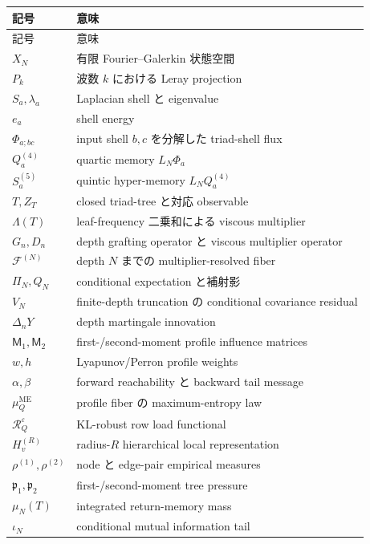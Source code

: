 \documentclass[11pt,a4paper,openany]{book}
\numberwithin{equation}{chapter}
\newcommand{\cF}{\mathcal F}
\newcommand{\cR}{\mathcal R}
\begin{document}
\begin{longtable}{p{}p{}}
\toprule
記号 & 意味 \\
\midrule
\endfirsthead
\toprule
記号 & 意味 \\
\midrule
\endhead
$X_N$ & 有限 Fourier--Galerkin 状態空間 \\
$P_k$ & 波数 $k$ における Leray projection \\
$S_a,\lambda_a$ & Laplacian shell と eigenvalue \\
$e_a$ & shell energy \\
$\Phi_{a;bc}$ & input shell $b,c$ を分解した triad-shell flux \\
$Q_a^{(4)}$ & quartic memory $L_N\Phi_a$ \\
$S_a^{(5)}$ & quintic hyper-memory $L_NQ_a^{(4)}$ \\
$T,Z_T$ & closed triad-tree と対応 observable \\
$\Lambda(T)$ & leaf-frequency 二乗和による viscous multiplier \\
$G_n,D_n$ & depth grafting operator と viscous multiplier operator \\
$\cF^{(N)}$ & depth $N$ までの multiplier-resolved fiber \\
$\Pi_N,Q_N$ & conditional expectation と補射影 \\
$V_N$ & finite-depth truncation の conditional covariance residual \\
$\Delta_nY$ & depth martingale innovation \\
$\mathsf M_1,\mathsf M_2$ & first-/second-moment profile influence matrices \\
$w,h$ & Lyapunov/Perron profile weights \\
$\alpha,\beta$ & forward reachability と backward tail message \\
$\mu_Q^{\mathrm{ME}}$ & profile fiber の maximum-entropy law \\
$\cR_Q^\varepsilon$ & KL-robust row load functional \\
$H_v^{(R)}$ & radius-$R$ hierarchical local representation \\
$\rho^{(1)},\rho^{(2)}$ & node と edge-pair empirical measures \\
$\mathfrak p_1,\mathfrak p_2$ & first-/second-moment tree pressure \\
$\mu_N(T)$ & integrated return-memory mass \\
$\iota_N$ & conditional mutual information tail \\
\bottomrule
\end{longtable}
\end{document}
